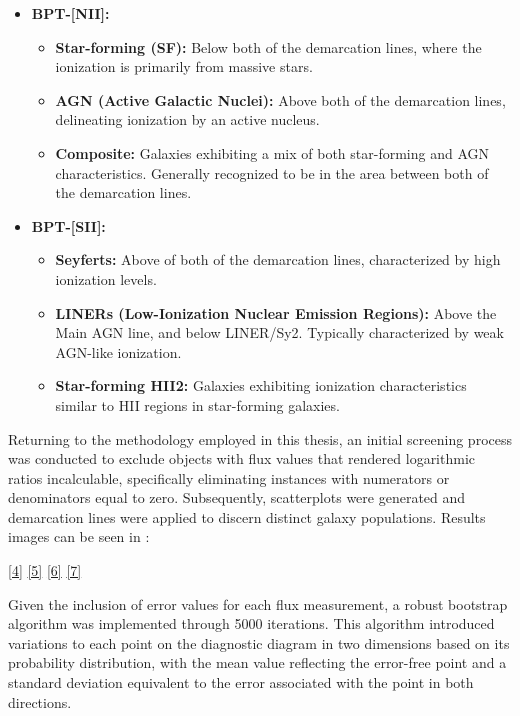 \begin{itemize}
    \item \textbf{BPT-[NII]:}

		\begin{itemize}
    		\item \textbf{Star-forming (SF):} Below both of the demarcation lines, where the ionization is primarily from massive stars.
    		\item \textbf{AGN (Active Galactic Nuclei):} Above both of the demarcation lines, delineating ionization by an active nucleus.
    		\item \textbf{Composite:} Galaxies exhibiting a mix of both star-forming and AGN characteristics. Generally recognized to be in the area between both of the demarcation lines.
		\end{itemize}

		\item \textbf{BPT-[SII]:}
	\begin{itemize}
    		\item \textbf{Seyferts:} Above of both of the demarcation lines, characterized by high ionization levels.
    		\item \textbf{LINERs (Low-Ionization Nuclear Emission Regions):} Above the Main AGN line, and below LINER/Sy2.  Typically characterized by weak AGN-like ionization.
    		\item \textbf{Star-forming HII2:} Galaxies exhibiting ionization characteristics similar to HII regions in star-forming galaxies.
		\end{itemize}

\end{itemize}


Returning to the methodology employed in this thesis, an initial screening process was conducted to exclude objects with flux values that rendered logarithmic ratios incalculable, specifically eliminating instances with numerators or denominators equal to zero. Subsequently, scatterplots were generated and demarcation lines were applied to discern distinct galaxy populations.
Results images can be seen in :

\autoref{4} \autoref{5} \autoref{6} \autoref{7}

Given the inclusion of error values for each flux measurement, a robust bootstrap algorithm was implemented through 5000 iterations. This algorithm introduced variations to each point on the diagnostic diagram in two dimensions based on its probability distribution, with the mean value reflecting the error-free point and a standard deviation equivalent to the error associated with the point in both directions.

